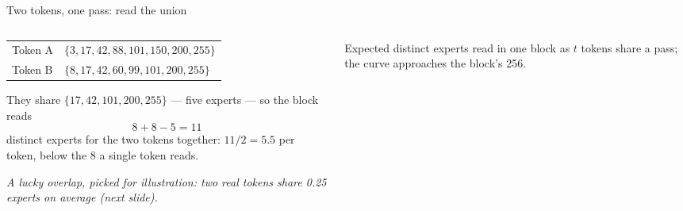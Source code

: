 \documentclass[aspectratio=169]{beamer}
\begin{document}
\begin{frame}{Two tokens, one pass: read the union}

\begin{columns}[T]
\begin{column}{0.54\textwidth}
\small
\begin{tabular}{@{}ll@{}}
\toprule
Token A & $\{3,17,42,88,101,150,200,255\}$ \\
Token B & $\{8,17,42,60,99,101,200,255\}$ \\
\bottomrule
\end{tabular}

\vspace{0.7em}
They share $\{17,42,101,200,255\}$ --- five experts --- so the block reads
\[
8+8-5 = 11
\]
distinct experts for the two tokens together: $11/2=5.5$ per token, below the $8$ a single token reads.

\vspace{0.5em}
\footnotesize\textit{A lucky overlap, picked for illustration: two real tokens share 0.25 experts on average (next slide).}
\end{column}
\begin{column}{0.42\textwidth}
\centering
{}
\vspace{0.3em}

{\footnotesize Expected distinct experts read in one block as $t$ tokens share a pass; the curve approaches the block's 256.}
\end{column}
\end{columns}

\end{frame}
\end{document}
